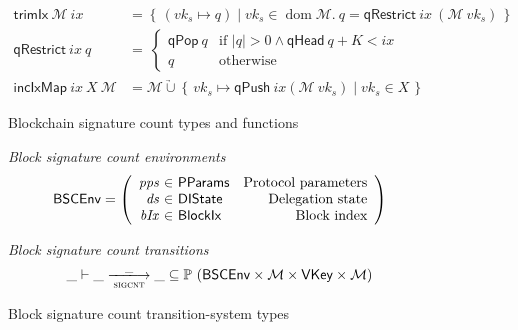 \documentclass[11pt,a4paper]{article}
\DeclareMathOperator{\dom}{dom}
\newcommand{\powerset}[1]{\mathbb{P}~#1}
\newcommand\Set[2]{\left\{\,#1\mid#2\,\right\}}
\newcommand{\unionoverride}{\mathbin{\underrightarrow\cup}}
\newcommand{\var}[1]{\mathit{#1}}
\newcommand{\fun}[1]{\mathsf{#1}}
\newcommand{\type}[1]{\mathsf{#1}}
\newcommand{\size}[1]{\left| #1 \right|}
\newcommand{\trans}[2]{\xlongrightarrow[\textsc{#1}]{#2}}
\newcommand{\partialf}{\mapsto}
\newcommand{\BlockIx}{\type{BlockIx}}
\newcommand{\VKey}{\type{VKey}}
\newcommand{\DelegState}{\type{DIState}}
\newcommand{\ProtParams}{\type{PParams}} %
\newcommand{\signmapname}{\mathcal{M}}
\newcommand{\trimixname}{trimIx}
\newcommand{\incixmapname}{incIxMap}
\newcommand{\qrestrname}{qRestrict}
\newcommand{\qpopname}{qPop}
\newcommand{\qheadname}{qHead}
\newcommand{\qpushname}{qPush}
\newcommand{\signmap}[1]{\fun{\signmapname} ~ #1}
\newcommand{\qrestr}[2]{\fun{\qrestrname} ~ #1 ~ #2}
\newcommand{\trimix}[2]{\fun{\trimixname} ~ #1 ~ #2}
\newcommand{\incixmap}[3]{\fun{\incixmapname} ~ #1 ~ #2 ~ #3}
\newcommand{\qpop}[1]{\fun{\qpopname} ~ #1}
\newcommand{\qhead}[1]{\fun{\qheadname} ~ #1}
\newcommand{\qpush}[1]{\fun{\qpushname} ~ #1}
\begin{document}
\begin{figure}[ht]
  \begin{align}
    \label{eq:trimix}
    \trimix{\signmapname}{\var{ix}} & = \Set{(\var{vk_s} \partialf q)}{\var{vk_s} \in \dom \signmapname.~
                                      q = \qrestr{\var{ix}}{(\signmap{\var{vk_s}}})} \\
    \qrestr{\var{ix}}{q} & = \
                           \begin{cases}
                             \qpop{q} & \text{if } \size{q} > 0 \wedge \qhead{q} + K < \var{ix} \\
                             q & \text{otherwise}
                           \end{cases} \\
    \label{eq:incixmap}
    \incixmap{\var{ix}}{\var{X}}{\signmapname} & = \signmapname \unionoverride
                                                 \Set{\var{vk_s} \partialf \qpush{\var{ix}}(\signmap{\var{vk_s}})}{vk_s \in \var{X}}
  \end{align}
  \caption{Blockchain signature count types and functions}
  \label{fig:defs:sigcnt}
\end{figure}

\begin{figure}[ht]
  \emph{Block signature count environments}
  \begin{equation*}
    \BSCEnv =
    \left(
      \begin{array}{r@{~\in~}lr}
        \var{pps} & \ProtParams & \text{Protocol parameters} \\
        \var{ds} & \DelegState & \text{Delegation state} \\
        \var{bIx} & \BlockIx & \text{Block index}
      \end{array}
    \right)
  \end{equation*}

  \emph{Block signature count transitions}
  \begin{equation*}
    \_ \vdash \var{\_} \trans{sigcnt}{\_} \var{\_} \subseteq
    \powerset (\BSCEnv \times \signmapname \times \VKey \times \signmapname)
  \end{equation*}
  \caption{Block signature count transition-system types}
  \label{fig:ts-types:sigcnt}
\end{figure}
\end{document}
